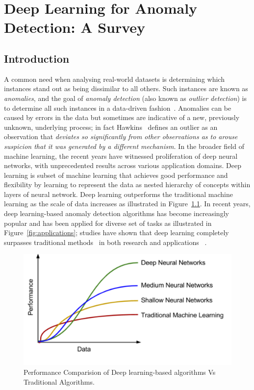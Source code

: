 \chapter{Deep Learning for Anomaly Detection: A Survey}
\label{chpt:survey}
\section{Introduction}

A common need when analysing real-world datasets is determining which instances stand out as being dissimilar to all others. Such instances are known as \emph{anomalies}, and the goal of \emph{anomaly detection} (also known as \emph{outlier detection}) is to determine all such instances in a data-driven fashion~\cite{chandola2007outlier}. Anomalies can be caused by errors in the data but sometimes are indicative of a new, previously unknown, underlying process; in fact Hawkins~\cite{hawkins} defines an outlier as an observation that {\it deviates so significantly from other observations as to arouse suspicion that it was generated by a different mechanism.} In the broader field of machine learning, the recent years have witnessed proliferation of deep neural networks, with unprecedented results across various application domains. Deep learning is subset of machine learning that achieves good performance and flexibility by learning to represent the data as nested hierarchy of concepts within layers of neural network. Deep learning outperforms the traditional machine learning as the scale of data increases as illustrated in Figure~\ref{fig:performanceCompare}. In recent years, deep learning-based anomaly detection algorithms has become increasingly popular and has been applied for diverse set of tasks as illustrated in Figure~\ref{fig:applications}; studies have shown that deep learning completely surpasses traditional methods~\cite{javaid2016deep,peng2015multi}  in both research and applications ~\cite{javaid2016deep}.

\begin{figure}[h]
\centering
\includegraphics[scale=0.5]{images/traditionalVsDeepLearning}
\captionsetup{justification=centering}
\caption{Performance Comparision of Deep learning-based algorithms Vs Traditional Algorithms.}
\label{fig:performanceCompare}
\end{figure}


